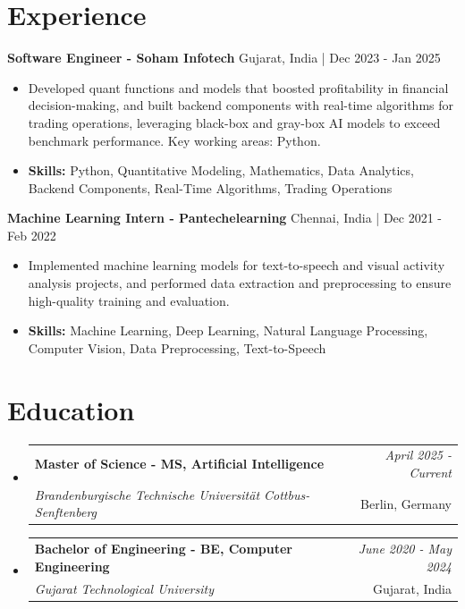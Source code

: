\documentclass[a4paper,11pt]{article}
\makeatletter
\newcommand{\resumeSubheading}[4]{
\vspace{0.5mm}\item
    \begin{tabular*}{\linewidth}[t]{l@{\extracolsep{\fill}}r}
        \textbf{#1} & \textit{\footnotesize{#4}} \\
        \textit{\footnotesize{#3}} &  \footnotesize{#2}\\
    \end{tabular*}
    \vspace{-2.4mm}
}
\makeatother
\begin{document}
\section{\textbf{Experience}}


\vspace{1mm}
  \textbf{Software Engineer - Soham Infotech} \hfill Gujarat, India | Dec 2023 - Jan 2025
\vspace{-1.5mm} %
\begin{itemize}
  \item Developed quant functions and models that boosted profitability in financial decision-making, and built backend components with real-time algorithms for trading operations, leveraging black-box and gray-box AI models to exceed benchmark performance. Key working areas: Python.

\vspace{-2mm}
  \item \textbf{Skills:} Python, Quantitative Modeling, Mathematics, Data Analytics, Backend Components, Real-Time Algorithms, Trading Operations
\end{itemize}

\vspace{1mm}
  \textbf{Machine Learning Intern - Pantechelearning} \hfill Chennai, India | Dec 2021 - Feb 2022
\vspace{-1.5mm} %
\begin{itemize}
  \item Implemented machine learning models for text-to-speech and visual activity analysis projects, and performed data extraction and preprocessing to ensure high-quality training and evaluation.
\vspace{-2mm}
  \item \textbf{Skills:} Machine Learning, Deep Learning, Natural Language Processing, Computer Vision, Data Preprocessing, Text-to-Speech
\end{itemize}\section{\textbf{Education}}
\vspace{-0.4mm}

\begin{itemize}[leftmargin=0.15in, label={}]
\resumeSubheading
{Master of Science - MS, Artificial Intelligence }{Berlin, Germany}
{Brandenburgische Technische Universität Cottbus-Senftenberg  }{April 2025 - Current}

\vspace{1.0mm} %
\resumeSubheading
{Bachelor of Engineering - BE, Computer Engineering  }{Gujarat, India}
{Gujarat Technological University }{June 2020 - May 2024}

\end{itemize}
\end{document}
